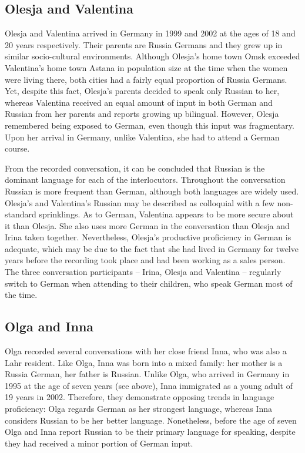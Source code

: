 \subsection{Olesja and Valentina}
Olesja and Valentina arrived in Germany in 1999 and 2002 at the ages of 18 and 20 years respectively. Their parents are Russia Germans and they grew up in similar socio-cultural environments. Although Olesja's home town Omsk exceeded Valentina's home town Astana in population size at the time when the women were living there, both cities had a fairly equal proportion of Russia Germans. Yet, despite this fact, Olesja's parents decided to speak only Russian to her, whereas Valentina received an equal amount of input in both German and Russian from her parents and reports growing up bilingual. However, Olesja remembered being exposed to German, even though this input was fragmentary. Upon her arrival in Germany, unlike Valentina, she had to attend a German course.

From the recorded conversation, it can be concluded that Russian is the dominant language for each of the interlocutors. Throughout the conversation Russian is more frequent than German, although both languages are widely used. Olesja's and Valentina's Russian may be described as colloquial with a few non-standard sprinklings. As to German, Valentina appears to be more secure about it than Olesja. She also uses more German in the conversation than Olesja and Irina taken together. Nevertheless, Olesja's productive proficiency in German is adequate, which may be due to the fact that she had lived in Germany for twelve years before the recording took place and had been working as a sales person. The three conversation participants  --  Irina, Olesja and Valentina  --  regularly switch to German when attending to their children, who speak German most of the time.

\subsection{Olga and Inna}
Olga recorded several conversations with her close friend Inna, who was also a Lahr resident. Like Olga, Inna was born into a mixed family: her mother is a Russia German, her father is Russian. Unlike Olga, who arrived in Germany in 1995 at the age of seven years (see above), Inna immigrated as a young adult of 19 years in 2002. Therefore, they demonstrate opposing trends in language proficiency: Olga regards German as her strongest language, whereas Inna considers  Russian to be her better language. Nonetheless, before the age of seven Olga and Inna report Russian to be their primary language for speaking, despite they had received a minor portion of German input.

